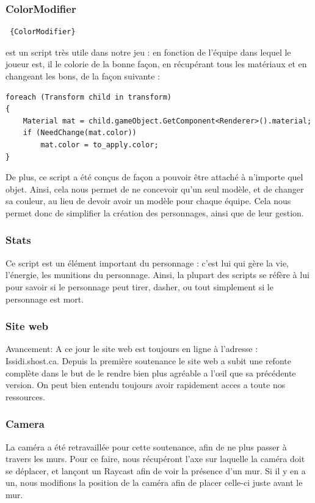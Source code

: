 ﻿\documentclass[12pt]{article}
\begin{document}
\subsubsection {ColorModifier}
\begin{verbatim} {ColorModifier} \end{verbatim} est un script très utile dans notre jeu : en fonction de l'équipe dans lequel
le joueur est, il le colorie de la bonne façon, en récupérant tous les matériaux et en changeant les bons, de la façon suivante :
\begin{verbatim}
foreach (Transform child in transform)
{
    Material mat = child.gameObject.GetComponent<Renderer>().material;
    if (NeedChange(mat.color))
        mat.color = to_apply.color;
}
\end{verbatim}
De plus, ce script a été conçus de façon a pouvoir être attaché à n'importe quel objet.
Ainsi, cela nous permet de ne concevoir qu'un seul modèle, et de changer sa couleur, au lieu de
devoir avoir un modèle pour chaque équipe. Cela nous permet donc de simplifier la création des
personnages, ainsi que de leur gestion.

\subsubsection {Stats}
Ce script est un élément important du personnage : c'est lui qui gère la vie, l'énergie, les munitions du personnage.
Ainsi, la plupart des scripts se réfère à lui pour savoir si le personnage peut tirer, dasher, ou tout simplement si 
le personnage est mort.

\subsubsection{Site web}
	Avancement:
	A ce jour le site web est toujours en ligne à l'adresse : Issidi.shost.ca.
    Depuis la première soutenance le site web a subit une refonte complète dans le but de le rendre bien plus agréable a l'œil que sa précédente version. On peut bien entendu toujours avoir rapidement acces a toute nos ressources.
\subsubsection {Camera}
La caméra a été retravaillée pour cette soutenance, afin de ne plus passer à travers les murs.
Pour ce faire, nous récupéront l'axe sur laquelle la caméra doit se déplacer, et lançont un Raycast afin de voir
la présence d'un mur. Si il y en a un, nous modifions la position de la caméra afin de placer celle-ci juste avant le mur.
\end{document}
